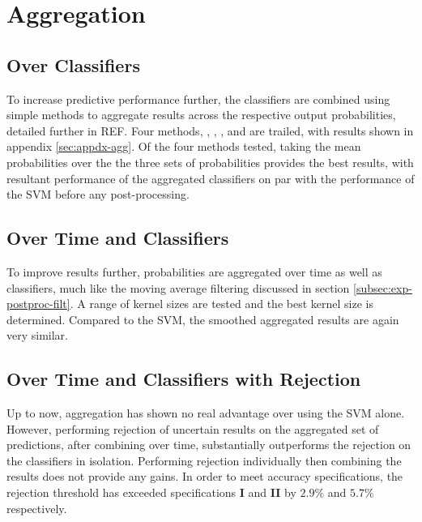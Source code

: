 \section{Aggregation}
\label{sec:exp-agg}

    \subsection{Over Classifiers}
    \label{subsec:exp-agg-clf}
        To increase predictive performance further, the classifiers are combined using simple methods to aggregate results across the respective output probabilities, detailed further in REF. Four methods, , , , and  are trailed, with results shown in appendix \ref{sec:appdx-agg}. Of the four methods tested, taking the mean probabilities over the the three sets of probabilities provides the best results, with resultant performance of the aggregated classifiers on par with the performance of the SVM before any post-processing. 
    
    \subsection{Over Time and Classifiers}
    \label{subsec:exp-agg-time}
        To improve results further, probabilities are aggregated over time as well as classifiers, much like the moving average filtering discussed in section \ref{subsec:exp-postproc-filt}. A range of kernel sizes are tested and the best kernel size is determined. Compared to the SVM, the smoothed aggregated results are again very similar.
        
    \subsection{Over Time and Classifiers with Rejection}
    \label{subsec:exp-agg-rej} 
        Up to now, aggregation has shown no real advantage over using the SVM alone. However, performing rejection of uncertain results on the aggregated set of predictions, after combining over time, substantially outperforms the rejection on the classifiers in isolation. Performing rejection individually then combining the results does not provide any gains. In order to meet accuracy specifications, the rejection threshold has exceeded specifications \textbf{I} and \textbf{II} by $2.9\%$ and $5.7\%$ respectively. 